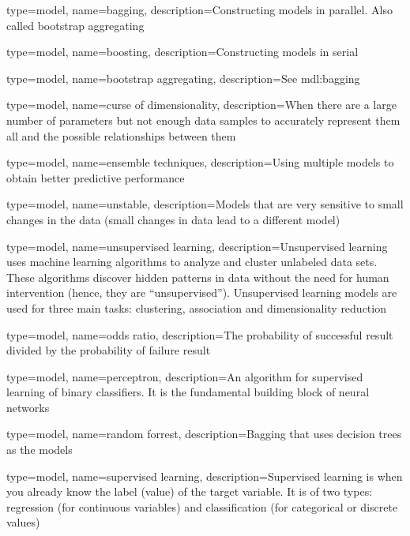 

{
	type=model,
    name=bagging,
    description={Constructing models in parallel.  Also called bootstrap aggregating}
}

{
	type=model,
    name=boosting,
    description={Constructing models in serial}
}

{
	type=model,
    name=bootstrap aggregating,
    description={See \gls{mdl:bagging}}
}

{
	type=model,
    name=curse of dimensionality,
    description={When there are a large number of parameters but not enough data samples to accurately represent them all and the possible relationships between them}
}

{
	type=model,
    name=ensemble techniques,
    description={Using multiple models to obtain better predictive performance}
}

{
	type=model,
    name=unstable,
    description={Models that are very sensitive to small changes in the data (small changes in data lead to a different model)}
}

{
	type=model,
    name=unsupervised learning,
    description={Unsupervised learning uses machine learning algorithms to analyze and cluster unlabeled data sets. These algorithms discover hidden patterns in data without the need for human intervention (hence, they are ``unsupervised'').  Unsupervised learning models are used for three main tasks: clustering, association and dimensionality reduction}
}

{
	type=model,
    name=odds ratio,
    description={The probability of successful result divided by the probability of failure result}
}

{
	type=model,
    name=perceptron,
    description={An algorithm for supervised learning of binary classifiers.  It is the fundamental building block of neural networks}
}

{
	type=model,
    name=random forrest,
    description={Bagging that uses decision trees as the models}
}

{
	type=model,
    name=supervised learning,
    description={Supervised learning is when you already know the label (value) of the target variable. It is of two types: regression (for continuous variables) and classification (for categorical or discrete values)}
} 